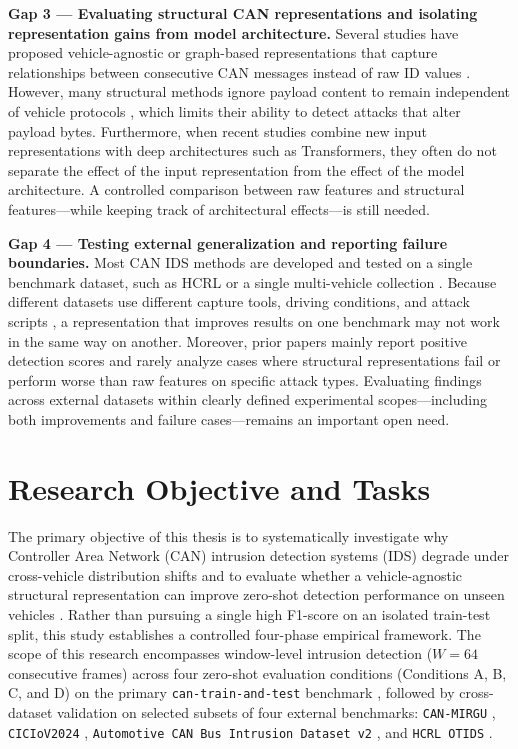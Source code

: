 \documentclass[12pt, a4paper, reqno, oneside]{book}
\newcommand \sect[1]{%
  \section*{#1}%
  \phantomsection%
  \addcontentsline{toc}{section}{#1}}
\begin{document}
\textbf{Gap 3 --- Evaluating structural CAN representations and isolating representation gains from model architecture.} Several studies have proposed vehicle-agnostic or graph-based representations that capture relationships between consecutive CAN messages instead of raw ID values \cite{islam2020graph, meng2023gbids}. However, many structural methods ignore payload content to remain independent of vehicle protocols \cite{meng2023gbids}, which limits their ability to detect attacks that alter payload bytes. Furthermore, when recent studies combine new input representations with deep architectures such as Transformers, they often do not separate the effect of the input representation from the effect of the model architecture. A controlled comparison between raw features and structural features---while keeping track of architectural effects---is still needed.

\textbf{Gap 4 --- Testing external generalization and reporting failure boundaries.} Most CAN IDS methods are developed and tested on a single benchmark dataset, such as HCRL \cite{song2020invehicle, lee2017otids} or a single multi-vehicle collection \cite{dupont2019automotive}. Because different datasets use different capture tools, driving conditions, and attack scripts \cite{lampe2024curated, rajapaksha2024canmirgu}, a representation that improves results on one benchmark may not work in the same way on another. Moreover, prior papers mainly report positive detection scores and rarely analyze cases where structural representations fail or perform worse than raw features on specific attack types. Evaluating findings across external datasets \cite{lee2017otids, dupont2019automotive, rajapaksha2024canmirgu, neto2024ciciov2024} within clearly defined experimental scopes---including both improvements and failure cases---remains an important open need.

\sect{Research Objective and Tasks}
\label{sect:objective}
The primary objective of this thesis is to systematically investigate why Controller Area Network (CAN) intrusion detection systems (IDS) degrade under cross-vehicle distribution shifts and to evaluate whether a vehicle-agnostic structural representation can improve zero-shot detection performance on unseen vehicles \cite{lampe2023cantrain, lampe2024curated}. Rather than pursuing a single high F1-score on an isolated train-test split, this study establishes a controlled four-phase empirical framework. The scope of this research encompasses window-level intrusion detection ($W = 64$ consecutive frames) across four zero-shot evaluation conditions (Conditions A, B, C, and D) on the primary \texttt{can-train-and-test} benchmark \cite{lampe2023cantrain, lampe2024curated}, followed by cross-dataset validation on selected subsets of four external benchmarks: \texttt{CAN-MIRGU} \cite{rajapaksha2024canmirgu}, \texttt{CICIoV2024} \cite{neto2024ciciov2024}, \texttt{Automotive CAN Bus Intrusion Dataset v2} \cite{dupont2019automotive}, and \texttt{HCRL OTIDS} \cite{lee2017otids}.
\end{document}
